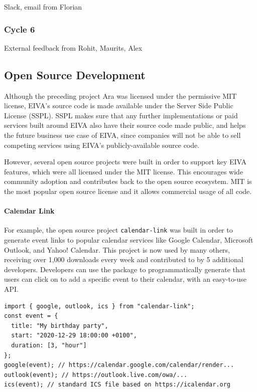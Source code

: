 \documentclass{article}
\begin{document}
Slack, email from Florian

\subsubsection{Cycle 6}

External feedback from Rohit, Maurits, Alex

\subsection{Open Source Development}

Although the preceding project Ara was licensed under the permissive MIT license, EIVA's source code is made available under the Server Side Public License (SSPL). SSPL makes sure that any further implementations or paid services built around EIVA also have their source code made public, and helps the future business use case of EIVA, since companies will not be able to sell competing services using EIVA's publicly-available source code.

However, several open source projects were built in order to support key EIVA features, which were all licensed under the MIT license. This encourages wide community adoption and contributes back to the open source ecosystem. MIT is the most popular open source license and it allows commercial usage of all code.

\paragraph{Calendar Link}

For example, the open source project \texttt{calendar-link} was built in order to generate event links to popular calendar services like Google Calendar, Microsoft Outlook, and Yahoo! Calendar. This project is now used by many others, receiving over 1,000 downloads every week and contributed to by 5 additional developers. Developers can use the package to programmatically generate that users can click on to add a specific event to their calendar, with an easy-to-use API.

\begin{verbatim}
import { google, outlook, ics } from "calendar-link";
const event = {
  title: "My birthday party",
  start: "2020-12-29 18:00:00 +0100",
  duration: [3, "hour"]
};
google(event); // https://calendar.google.com/calendar/render...
outlook(event); // https://outlook.live.com/owa/...
ics(event); // standard ICS file based on https://icalendar.org
\end{verbatim}
\end{document}
